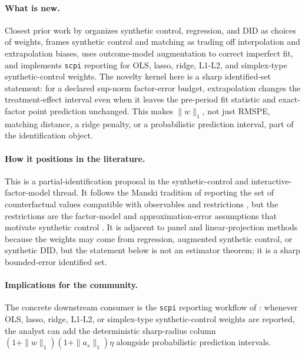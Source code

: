 \documentclass[11pt]{article}
\theoremstyle{definition}
\theoremstyle{plain}
\theoremstyle{remark}
\begin{document}
\paragraph{What is new.}
Closest prior work by \citet{DoudchenkoImbens2016} organizes synthetic control, regression, and DID as choices of weights, \citet{KelloggMogstadPouliotTorgovitsky2021} frames synthetic control and matching as trading off interpolation and extrapolation biases, \citet{BenMichaelFellerRothstein2021} uses outcome-model augmentation to correct imperfect fit, and \citet{CattaneoFengPalombaTitiunik2025JSS} implements \texttt{scpi} reporting for OLS, lasso, ridge, L1-L2, and simplex-type synthetic-control weights. The novelty kernel here is a sharp identified-set statement: for a declared sup-norm factor-error budget, extrapolation changes the treatment-effect interval even when it leaves the pre-period fit statistic and exact-factor point prediction unchanged. This makes \(\|w\|_1\), not just RMSPE, matching distance, a ridge penalty, or a probabilistic prediction interval, part of the identification object.

\paragraph{How it positions in the literature.}
This is a partial-identification proposal in the synthetic-control and interactive-factor-model thread. It follows the Manski tradition of reporting the set of counterfactual values compatible with observables and restrictions \citep{Manski1990}, but the restrictions are the factor-model and approximation-error assumptions that motivate synthetic control \citep{AbadieDiamondHainmueller2010,Abadie2021}. It is adjacent to panel and linear-projection methods because the weights may come from regression, augmented synthetic control, or synthetic DID, but the statement below is not an estimator theorem; it is a sharp bounded-error identified set.

\paragraph{Implications for the community.}
The concrete downstream consumer is the \texttt{scpi} reporting workflow of \citet{CattaneoFengPalombaTitiunik2025JSS}: whenever OLS, lasso, ridge, L1-L2, or simplex-type synthetic-control weights are reported, the analyst can add the deterministic sharp-radius column \((1+\|w\|_1)(1+\|a_s\|_1)\eta\) alongside probabilistic prediction intervals.
\end{document}
